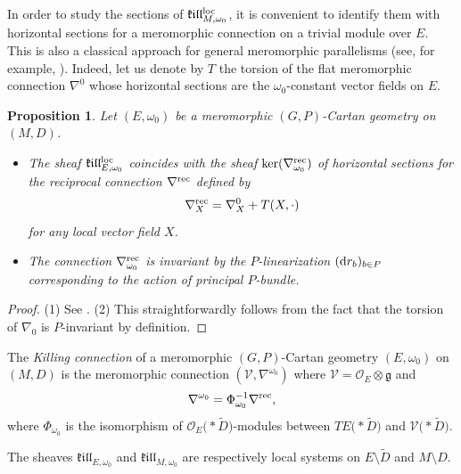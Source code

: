 \documentclass[pdftex]{sigma}
\numberwithin{equation}{section}
\newtheorem{Proposition}[Theorem]{Proposition}
 { \theoremstyle{definition}
\newtheorem{Definition}[Theorem]{Definition}
\newtheorem{Note}[Theorem]{Note}
\newtheorem{Exemple}[Theorem]{Example}
\newtheorem{Remark}[Theorem]{Remark} }
\begin{document}
In order to study the sections of $\mathfrak{k}\mathfrak{i}\mathfrak{l}\mathfrak{l}^{\rm loc}_{M,\omega_0}$, it is convenient to identify them with horizontal sections for a meromorphic connection on a trivial module over $E$. This is also a classical approach for general meromorphic parallelisms (see, for example, \cite[Lemma~3.2]{BlazquezCasale}). Indeed, let us denote by $T$ the torsion of the flat meromorphic connection $\nabla^0$ whose horizontal sections are the $\omega_0$-constant vector fields on $E$. %

\begin{Proposition}\label{connkillprop} Let $(E,\omega_0)$ be a meromorphic $(G,P)$-Cartan geometry on $(M,D)$.
\begin{itemize}\itemsep=0pt
\item[$(1)$] The sheaf $\mathfrak{k}\mathfrak{i}\mathfrak{l}\mathfrak{l}^{\rm loc}_{E,\omega_0}$ coincides with the sheaf $\ker(\nabla^{\rm rec}_{\omega_0})$ of horizontal sections for the reciprocal connection $\nabla^{\rm rec}$ defined by
\[ \nabla^{\rm rec}_X = \nabla^0_X + T(X,\cdot)\]
 for any local vector field $X$.
\item[$(2)$] The connection $\nabla^{\rm rec}_{\omega_0}$ is invariant by the $P$-linearization $({\rm d}r_b)_{b\in P}$ corresponding to the action of principal $P$-bundle.
\end{itemize}
\end{Proposition}
\begin{proof} (1) See \cite[Lemma 3.2]{BlazquezCasale}.  (2) This straightforwardly follows from the fact that the torsion of $\nabla_0$ is $P$-invariant by definition.
\end{proof}

\begin{Definition}\label{connkill} The \textit{Killing connection} of a meromorphic $(G,P)$-Cartan geometry $(E,\omega_0)$ on~$(M,D)$ is the meromorphic connection $(\mathcal{V},\nabla^{\omega_0})$ where $\mathcal{V}=\mathcal{O}_E\otimes \mathfrak{g}$ and
\[\nabla^{\omega_0}= \Phi_{\omega_0}^{-1} \nabla^{\rm rec},\]
 where $\Phi_{\omega_0}$ is the isomorphism of $\mathcal{O}_E\bigl(* \tilde{D}\bigr)$-modules between $TE\bigl(* \tilde{D}\bigr)$ and $\mathcal{V}\bigl(* \tilde{D}\bigr)$.
\end{Definition}

The sheaves $\mathfrak{k}\mathfrak{i}\mathfrak{l}\mathfrak{l}_{E,\omega_0}$ and $\mathfrak{k}\mathfrak{i}\mathfrak{l}\mathfrak{l}_{M,\omega_0}$ are respectively local systems on $E\setminus \tilde{D}$ and $M\setminus D$.
\end{document}
